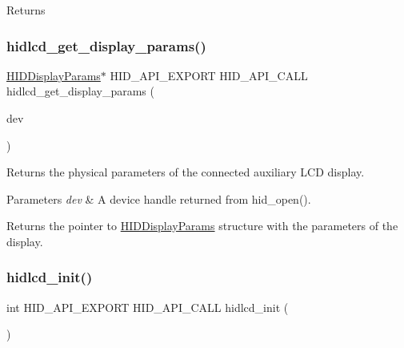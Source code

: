 \begin{DoxyReturn}{Returns}

\end{DoxyReturn}
\mbox{\label{group__API_gabb41034a653433cec87bd56d20e7da32}} 
\subsubsection{\texorpdfstring{hidlcd\+\_\+get\+\_\+display\+\_\+params()}{hidlcd\_get\_display\_params()}}
{\footnotesize\ttfamily \hyperlink{structHIDDisplayParams}{H\+I\+D\+Display\+Params}$\ast$ H\+I\+D\+\_\+\+A\+P\+I\+\_\+\+E\+X\+P\+O\+RT H\+I\+D\+\_\+\+A\+P\+I\+\_\+\+C\+A\+LL hidlcd\+\_\+get\+\_\+display\+\_\+params (\begin{DoxyParamCaption}\item[{hid\+\_\+device $\ast$}]{dev }\end{DoxyParamCaption})}



Returns the physical parameters of the connected auxiliary L\+CD display. 


\begin{DoxyParams}{Parameters}
{\em dev} & A device handle returned from hid\+\_\+open(). \\
\hline
\end{DoxyParams}
\begin{DoxyReturn}{Returns}
the pointer to \hyperlink{structHIDDisplayParams}{H\+I\+D\+Display\+Params} structure with the parameters of the display. 
\end{DoxyReturn}
\mbox{\label{group__API_ga37c732d4d14ea4584ee33e6e258deba7}} 
\subsubsection{\texorpdfstring{hidlcd\+\_\+init()}{hidlcd\_init()}}
{\footnotesize\ttfamily int H\+I\+D\+\_\+\+A\+P\+I\+\_\+\+E\+X\+P\+O\+RT H\+I\+D\+\_\+\+A\+P\+I\+\_\+\+C\+A\+LL hidlcd\+\_\+init (\begin{DoxyParamCaption}\item[{void}]{ }\end{DoxyParamCaption})}



